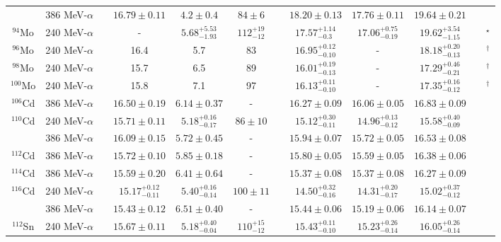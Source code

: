\begin{table}[t!]
{\begin{tabular}{@{}cccccccccc@{}cc}
  & 386 MeV-$\alpha$ & & $16.79\pm0.11$ & $4.2\pm0.4$ & $84\pm6$ & & $18.20\pm0.13$ & $17.76\pm0.11$ & $19.64\pm0.21$ & & \cite{YKGPLB2016} \\
$^{94}$Mo & 240 MeV-$\alpha$ & & - & ${5.68}^{+5.53}_{-1.93}$ & ${112}^{+19}_{-12}$ &&  ${17.57}^{+1.14}_{-0.3}$ & ${17.06}^{+0.75}_{-0.19}$ & ${19.62}^{+3.54}_{-1.15}$ & & \cite{Button2016}$^\star$\\
$^{96}$Mo & 240 MeV-$\alpha$ & & 16.4 & 5.7 & 83 & & ${16.95}^{+0.12}_{-0.10}$ & - & ${18.18}^{+0.20}_{-0.13}$ & & \cite{Button2016}$^\dagger$\\
$^{98}$Mo & 240 MeV-$\alpha$ & & 15.7 & 6.5 & 89 & & ${16.01}^{+0.19}_{-0.13}$ & - & ${17.29}^{+0.46}_{-0.21}$ & & \cite{Button2016}$^\dagger$\\
$^{100}$Mo & 240 MeV-$\alpha$ & & 15.8 & 7.1 & 97 & & ${16.13}^{+0.11}_{-0.10}$ & - & ${17.35}^{+0.16}_{-0.12}$ & & \cite{Button2016}$^\dagger$\\								
$^{106}$Cd&386 MeV-$\alpha$ & & $16.50\pm0.19$ & $6.14\pm0.37$ & - & & $16.27\pm 0.09$ & $16.06\pm0.05$ & $16.83\pm0.09$ & & \cite{Darshana2012} \\
$^{110}$Cd & 240 MeV-$\alpha$ & & $15.71\pm0.11$ & ${5.18}^{+0.16}_{-0.17}$ & $86\pm10$ & & ${15.12}^{+0.30}_{-0.11}$ & ${14.96}^{+0.13}_{-0.12}$ & ${15.58}^{+0.40}_{-0.09}$ & & \cite{DHY2004_Cd}\\
  & 386 MeV-$\alpha$ & & $16.09\pm0.15$ & $5.72\pm0.45$ & - & & $15.94\pm0.07$ & $15.72\pm0.05$ & $16.53\pm0.08$ & & \cite{Darshana2012} \\
$^{112}$Cd & 386 MeV-$\alpha$ & & $15.72\pm0.10$ & $5.85\pm0.18$ & - & & $15.80\pm0.05$ & $15.59\pm0.05$ & $16.38\pm0.06$ & & \cite{Darshana2012} \\
$^{114}$Cd & 386 MeV-$\alpha$ & & $15.59\pm0.20$ & $6.41\pm0.64$ & - & & $15.37\pm0.08$ & $15.37\pm0.08$ & $16.27\pm0.09$ & & \cite{Darshana2012} \\
$^{116}$Cd & 240 MeV-$\alpha$ & & ${15.17}^{+0.12}_{-0.11}$ & ${5.40}^{+0.16}_{-0.14}$ & $100\pm11$ && ${14.50}^{+0.32}_{-0.16}$ & ${14.31}^{+0.20}_{-0.17}$ & ${15.02}^{+0.37}_{-0.12}$ & & \cite{DHY2004_Cd}\\		
  & 386 MeV-$\alpha$ && $15.43\pm0.12$ & $6.51\pm0.40$ & - & & $15.44\pm0.06$ & $15.19\pm0.06$ & $16.14\pm0.07$ & & \cite{Darshana2012} \\
$^{112}$Sn & 240 MeV-$\alpha$ & & $15.67 \pm 0.11$ & ${5.18}^{+0.40}_{-0.04}$ & ${110}^{+15}_{-12}$ & & ${15.43}^{+0.11}_{-0.10}$ & ${15.23}^{+0.26}_{-0.14}$ & ${16.05}^{+0.26}_{-0.14}$ & & \cite{DHY2004_Sn}\\			

\end{tabular}}
\end{table}

